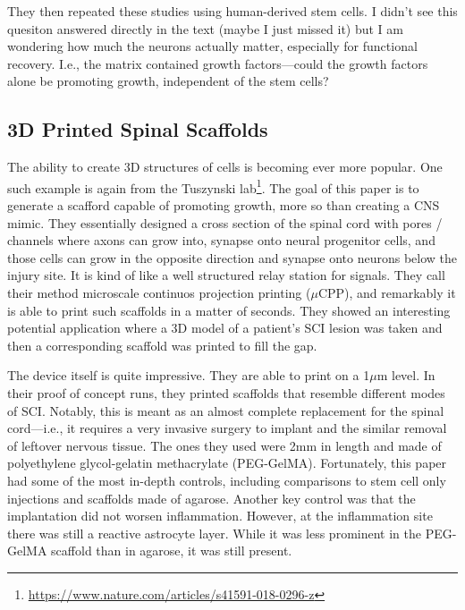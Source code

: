 They then repeated these studies using human-derived stem cells. I didn't see this quesiton answered directly in the text (maybe I just missed it) but I am wondering how much the neurons actually matter, especially for functional recovery. I.e., the matrix contained growth factors---could the growth factors alone be promoting growth, independent of the stem cells?

\subsection{3D Printed Spinal Scaffolds}

The ability to create 3D structures of cells is becoming ever more popular. One such example is again from the Tuszynski lab\footnote{\url{https://www.nature.com/articles/s41591-018-0296-z}}. The goal of this paper is to generate a scafford capable of promoting growth, more so than creating a CNS mimic. They essentially designed a cross section of the spinal cord with pores / channels where axons can grow into, synapse onto neural progenitor cells, and those cells can grow in the opposite direction and synapse onto neurons below the injury site. It is kind of like a well structured relay station for signals. They call their method microscale continuos projection printing ($\mu$CPP), and remarkably it is able to print such scaffolds in a matter of seconds. They showed an interesting potential application where a 3D model of a patient's SCI lesion was taken and then a corresponding scaffold was printed to fill the gap. \newline

The device itself is quite impressive. They are able to print on a 1$\mu$m level. In their proof of concept runs, they printed scaffolds that resemble different modes of SCI. Notably, this is meant as an almost complete replacement for the spinal cord---i.e., it requires a very invasive surgery to implant and the similar removal of leftover nervous tissue. The ones they used were 2mm in length and made of polyethylene glycol-gelatin methacrylate (PEG-GelMA). Fortunately, this paper had some of the most in-depth controls, including comparisons to stem cell only injections and scaffolds made of agarose. Another key control was that the implantation did not worsen inflammation. However, at the inflammation site there was still a reactive astrocyte layer. While it was less prominent in the PEG-GelMA scaffold than in agarose, it was still present.\newline

